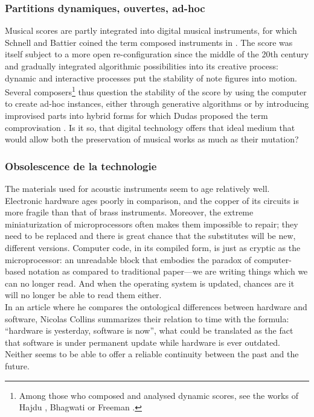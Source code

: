 \subsubsection{Partitions dynamiques, ouvertes, ad-hoc}
\noindent  Musical scores are partly integrated into digital musical instruments, for which Schnell and Battier coined the term composed instruments in \cite{schnell_introducing_2002}. The score was itself subject to a more open re-configuration since the middle of the 20th century and gradually integrated algorithmic possibilities into its creative process: dynamic and interactive processes put the stability of note figures into motion. Several composers\footnote{ Among those who composed and analysed dynamic scores, see the works of Hajdu \cite{hajdu_disposable_2016}, Bhagwati \cite{bhagwati_vexations_2017} or Freeman \cite{freeman_extreme_2008}.} thus question the stability of the score by using the computer to create ad-hoc instances, either through generative algorithms or by introducing improvised parts into hybrid forms for which Dudas proposed the term comprovisation \cite{dudas_comprovisation:_2010}. Is it so, that digital technology offers that ideal medium that would allow both the preservation of musical works as much as their mutation?

\subsubsection{Obsolescence de la technologie}

The materials used for acoustic instruments seem to age relatively well. Electronic hardware ages poorly in comparison, and the copper of its circuits is more fragile than that of brass instruments. Moreover, the extreme miniaturization of microprocessors often makes them impossible to repair; they need to be replaced and there is great chance that the substitutes will be new, different versions. Computer code, in its compiled form, is just as cryptic as the microprocessor: an unreadable block that embodies the paradox of computer-based notation as compared to traditional paper—we are writing things which we can no longer read. And when the operating system is updated, chances are it will no longer be able to read them either.\\
In an article where he compares the ontological differences between hardware and software, Nicolas Collins \cite{collins_semiconducting_2013} summarizes their relation to time with the formula: “hardware is yesterday, software is now”, what could be translated as the fact that software is under permanent update while hardware is ever outdated. Neither seems to be able to offer a reliable continuity between the past and the future.
	
